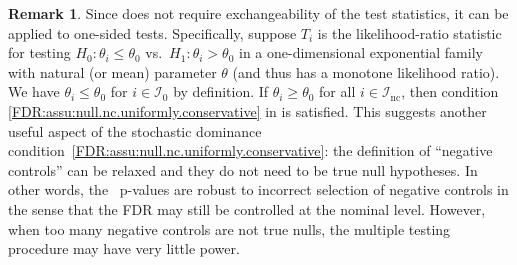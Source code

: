 \documentclass[a4paper,11pt]{article}
\theoremstyle{plain}
\theoremstyle{definition}
\newtheorem{remark}{Remark}
\def\calI{\mathcal{I}}
\theoremstyle{plain}
\newcommand{\pval}[1]{{p_{#1}}}
\newcommand{\testStatistics}[1]{{T_{#1}}}
\newcommand{\ncTestStatistics}[1]{{C_{#1}}}
\newcommand{\nickname}{{\text{RANC}}}
\newcommand{\hypothesis}[1]{{H_{#1}}}
\newcommand{\hypothesisIndex}[1]{{\calI_{#1}}}
\newcommand{\nullHypothesisIndex}{{\calI_{0}}}
\newcommand{\FDR}{\text{FDR}}
\newcommand{\BH}{{\text{BH}}}
\begin{document}
\begin{remark} \label{rem:one-sided}
  Since  does not require exchangeability of the test
  statistics, it can be applied to one-sided tests. Specifically,
  suppose $T_i$ is
  the likelihood-ratio statistic for testing $\hypothesis{0}: \theta_i
  \le \theta_0$ vs.\ $\hypothesis{1}: \theta_i > \theta_0$ in a
  one-dimensional exponential family with natural (or mean) parameter
  $\theta$ (and thus has a monotone likelihood ratio). We have
  $\theta_i \leq \theta_0$ for $i \in \hypothesisIndex{0}$ by
  definition. If $\theta_i \geq \theta_0$ for all $i \in
  \hypothesisIndex{\text{nc}}$, then
  condition \ref{FDR:assu:null.nc.uniformly.conservative} in
   is satisfied. This suggests another useful aspect of
  the stochastic dominance
  condition~\ref{FDR:assu:null.nc.uniformly.conservative}: the
  definition of ``negative controls'' can be relaxed and they do not need to
  be true null hypotheses. In other words, the \nickname~p-values are
  robust to incorrect selection of negative controls in the sense that
  the FDR may still be controlled at the nominal level. However, when
  too many negative controls are not true nulls, the multiple testing
  procedure may have very little power.

\end{remark}
\end{document}

